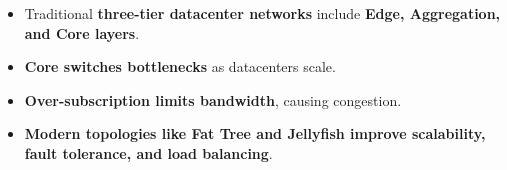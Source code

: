 \highspace
\begin{takeawaysbox}
    \begin{itemize}
        \item Traditional \textbf{three-tier datacenter networks} include \textbf{Edge, Aggregation, and Core layers}.
        \item \textbf{Core switches bottlenecks} as datacenters scale.
        \item \textbf{Over-subscription limits bandwidth}, causing congestion.
        \item \textbf{Modern topologies like Fat Tree and Jellyfish improve scalability, fault tolerance, and load balancing}.
    \end{itemize}
\end{takeawaysbox}